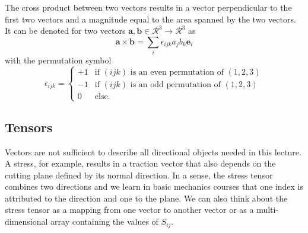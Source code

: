 The cross product between two vectors results in a vector perpendicular to the first two vectors and a magnitude equal to the area spanned by the two vectors. It can be denoted for two vectors $\mathbf{a},\mathbf{b} \in \mathcal{R}^3 \rightarrow \mathcal{R}^3$ as 
\begin{equation}
    \mathbf{a} \times \mathbf{b} = \sum_i \epsilon_{ijk} a_j b_k \mathbf{e}_i 
\end{equation}
with the permutation symbol 
\begin{equation}
    \epsilon_{ijk} = 
    \begin{cases}
        +1  & \text{if } (ijk) \text{ is an even permutation of } (1,2,3)\\
        -1  & \text{if } (ijk) \text{ is an odd permutation of } (1,2,3)\\
        0   & \text{else}.
    \end{cases}
\end{equation}

\subsection{Tensors}
Vectors are not sufficient to describe all directional objects needed in this lecture. A stress, for example, results in a traction vector that also depends on the cutting plane defined by its normal direction. 
In a sense, the stress tensor combines two directions and we learn in basic mechanics courses that one index is attributed to the direction and one to the plane. We can also think about the stress tensor as a mapping from one vector to another vector or as a multi-dimensional array containing the values of $S_{ij}$.

